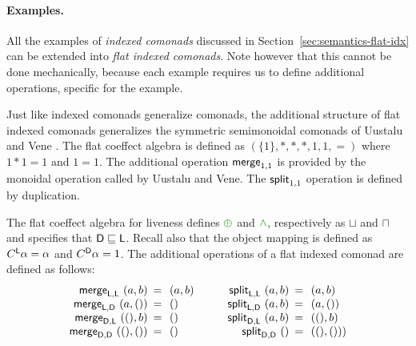 \paragraph{Examples.}
All the examples of \emph{indexed comonads} discussed in Section~\ref{sec:semantics-flat-idx} can
be extended into \emph{flat indexed comonads}. Note however that this cannot be done mechanically,
because each example requires us to define additional operations, specific for the example.

\begin{example}
Just like indexed comonads generalize co\-monads, the additional structure of
flat indexed comonads generalizes the symmetric semimonoidal comonads of Uustalu
and Vene \cite{comonads-notions}. The flat coeffect algebra is defined as $(\{1\}, \ast, \ast, \ast, 1, 1, =)$
where $1\ast1=1$ and $1=1$. The additional operation $\textnormal{\sffamily merge}_{1,1}$ is provided by the
monoidal operation called  by Uustalu and Vene. The $\textnormal{\sffamily split}_{1,1}$ operation
is defined by duplication.
\end{example}

\begin{example}
\label{thm:semantics-indexed-opt}

The flat coeffect algebra for liveness defines $\cpar$ and $\czip$, respectively as $\sqcup$ and $\sqcap$
and specifies that $\textnormal{\sffamily D} \sqsubseteq \textnormal{\sffamily L}$. Recall also that the object mapping is defined
as $C^{\textnormal{\sffamily L}}\alpha = \alpha$ and $C^{\textnormal{\sffamily D}}\alpha = 1$. The additional operations
of a flat indexed comonad are defined as follows:
%
\begin{equation*}
\begin{array}{rcl}
\ident{merge}_{\ident{L}, \ident{L}}~(a, b) &\narrow{=}& (a, b)\\
\ident{merge}_{\ident{L}, \ident{D}}~(a, ()) &\narrow{=}& ()\\
\ident{merge}_{\ident{D}, \ident{L}}~((), b) &\narrow{=}& ()\\
\ident{merge}_{\ident{D}, \ident{D}}~((), ()) &\narrow{=}& ()\\
\end{array}
\qquad
\begin{array}{rcl}
\ident{split}_{\ident{L}, \ident{L}}~(a, b) &\narrow{=}& (a, b)\\
\ident{split}_{\ident{L}, \ident{D}}~(a, b) &\narrow{=}& (a, ())\\
\ident{split}_{\ident{D}, \ident{L}}~(a, b) &\narrow{=}& ((), b)\\
\ident{split}_{\ident{D}, \ident{D}}~() &\narrow{=}& ((), ()))\\
\end{array}
\end{equation*}
\end{example}

